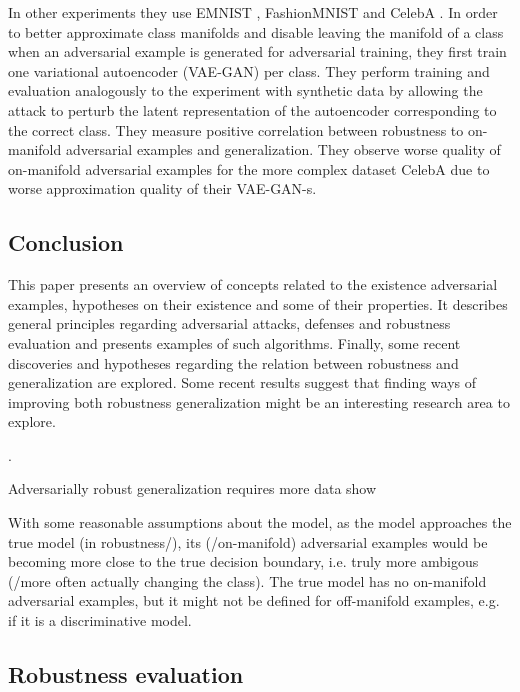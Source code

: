 \documentclass[twocolumn]{article}
\begin{document}
In other experiments they use EMNIST \citep{Cohen:2017:EMNIST}, FashionMNIST \citep{Xiao:2017:FMNIDBMLA} and CelebA \citep{Liu:2015:DLFAW}. In order to better approximate class manifolds and disable leaving the manifold of a class when an adversarial example is generated for adversarial training, they first train one variational autoencoder (VAE-GAN) per class. They perform training and evaluation analogously to the experiment with synthetic data by allowing the attack to perturb the latent representation of the autoencoder corresponding to the correct class. They measure positive correlation between robustness to on-manifold adversarial examples and generalization. They observe worse quality of on-manifold adversarial examples for the more complex dataset CelebA due to worse approximation quality of their VAE-GAN-s.


\subsection{Conclusion}

This paper presents an overview of concepts related to the existence adversarial examples, hypotheses on their existence and some of their properties. It describes general principles regarding adversarial attacks, defenses and robustness evaluation and presents examples of such algorithms. Finally, some recent discoveries and hypotheses regarding the relation between robustness and generalization are explored. Some recent results  \citep{Stutz:2018:DARG} suggest that finding ways of improving both robustness generalization might be an interesting research area to explore.


\newpage.
\newpage

 Adversarially robust generalization requires
more data show 

With some reasonable assumptions about the model, as the model approaches the true model (in robustness/), its (/on-manifold) adversarial examples would be becoming more close to the true decision boundary, i.e. truly more ambigous (/more often actually changing the class). The true model has no on-manifold adversarial examples, but it might not be defined for off-manifold examples, e.g. if it is a discriminative model.









\newpage

\subsection{Robustness evaluation}
\end{document}
